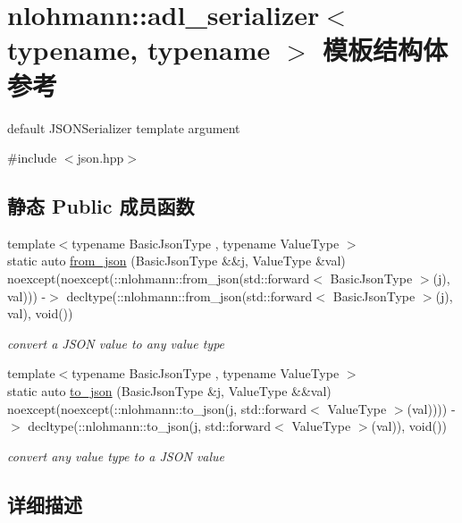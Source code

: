 \hypertarget{structnlohmann_1_1adl__serializer}{}\section{nlohmann\+::adl\+\_\+serializer$<$ typename, typename $>$ 模板结构体 参考}
\label{structnlohmann_1_1adl__serializer}


default J\+S\+O\+N\+Serializer template argument  




{\ttfamily \#include $<$json.\+hpp$>$}

\subsection*{静态 Public 成员函数}
\begin{DoxyCompactItemize}
\item 
{\footnotesize template$<$typename Basic\+Json\+Type , typename Value\+Type $>$ }\\static auto \mbox{\hyperlink{structnlohmann_1_1adl__serializer_a2c544585b8b1828a0f1eecd831d0496e}{from\+\_\+json}} (Basic\+Json\+Type \&\&j, Value\+Type \&val) noexcept(noexcept(\+::nlohmann\+::from\+\_\+json(std\+::forward$<$ Basic\+Json\+Type $>$(j), val))) -\/$>$ decltype(\+::nlohmann\+::from\+\_\+json(std\+::forward$<$ Basic\+Json\+Type $>$(j), val), void())
\begin{DoxyCompactList}\small\item\em convert a J\+S\+ON value to any value type \end{DoxyCompactList}\item 
{\footnotesize template$<$typename Basic\+Json\+Type , typename Value\+Type $>$ }\\static auto \mbox{\hyperlink{structnlohmann_1_1adl__serializer_a01b867bd5dce5249d4f7433b8f27def6}{to\+\_\+json}} (Basic\+Json\+Type \&j, Value\+Type \&\&val) noexcept(noexcept(\+::nlohmann\+::to\+\_\+json(j, std\+::forward$<$ Value\+Type $>$(val)))) -\/$>$ decltype(\+::nlohmann\+::to\+\_\+json(j, std\+::forward$<$ Value\+Type $>$(val)), void())
\begin{DoxyCompactList}\small\item\em convert any value type to a J\+S\+ON value \end{DoxyCompactList}\end{DoxyCompactItemize}


\subsection{详细描述}
